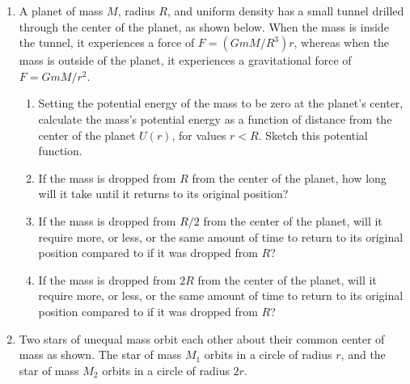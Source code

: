 \documentclass{../../oss-apphys}
\begin{document}
\begin{enumerate}[leftmargin=15pt]
\item A planet of mass $M$, radius $R$, and uniform density has a small tunnel
  drilled through the center of the planet, as shown below. When the mass is
  inside the tunnel, it experiences a force of $F=(GmM/R^3)r$, whereas when the
  mass is outside of the planet, it experiences a gravitational force of
  $F=GmM/r^2$.
  \begin{center}
  \end{center}
  \begin{enumerate}[noitemsep,leftmargin=20pt]
  \item Setting the potential energy of the mass to be zero at the planet's
    center, calculate the mass's potential energy as a function of distance from
    the center of the planet $U(r)$, for values $r<R$. Sketch this potential
    function.
  \item If the mass is dropped from $R$ from the center of the planet, how long
    will it take until it returns to its original position?
  \item If the mass is dropped from $R/2$ from the center of the planet, will
    it require more, or less, or the same amount of time to return to its
    original position compared to if it was dropped from $R$?
  \item If the mass is dropped from $2R$ from the center of the planet, will
    it require more, or less, or the same amount of time to return to its
    original position compared to if it was dropped from $R$?
  \end{enumerate}
  \newpage
\item Two stars of unequal mass orbit each other about their common center of
  mass as shown. The star of mass $M_1$ orbits in a circle of radius $r$, and
  the star of mass $M_2$ orbits in a circle of radius $2r$.
  \begin{center}
\end{center}
\end{enumerate}
\end{document}
